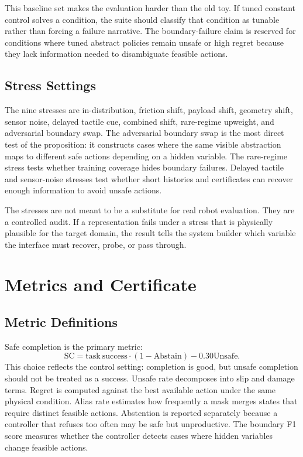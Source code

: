 \documentclass{article}
\newcommand{\safecomp}{\mathrm{SC}}
\newcommand{\unsafe}{\mathrm{Unsafe}}
\newcommand{\abstain}{\mathrm{Abstain}}
\begin{document}
This baseline set makes the evaluation harder than the old toy. If tuned
constant control solves a condition, the suite should classify that condition as
tunable rather than forcing a failure narrative. The boundary-failure claim is
reserved for conditions where tuned abstract policies remain unsafe or high regret
because they lack information needed to disambiguate feasible actions.

\subsection{Stress Settings}

The nine stresses are in-distribution, friction shift, payload shift, geometry
shift, sensor noise, delayed tactile cue, combined shift, rare-regime upweight,
and adversarial boundary swap. The adversarial boundary swap is the most direct
test of the proposition: it constructs cases where the same visible abstraction
maps to different safe actions depending on a hidden variable. The rare-regime
stress tests whether training coverage hides boundary failures. Delayed tactile
and sensor-noise stresses test whether short histories and certificates can
recover enough information to avoid unsafe actions.

The stresses are not meant to be a substitute for real robot evaluation. They are
a controlled audit. If a representation fails under a stress that is physically
plausible for the target domain, the result tells the system builder which
variable the interface must recover, probe, or pass through.

\section{Metrics and Certificate}

\subsection{Metric Definitions}

Safe completion is the primary metric:
\begin{equation}
    \safecomp = \mathrm{task\ success}\cdot(1-\abstain) - 0.30\unsafe.
\end{equation}
This choice reflects the control setting: completion is good, but unsafe
completion should not be treated as a success. Unsafe rate decomposes into slip
and damage terms. Regret is computed against the best available action under the
same physical condition. Alias rate estimates how frequently a mask merges states
that require distinct feasible actions. Abstention is reported separately because
a controller that refuses too often may be safe but unproductive. The boundary
F1 score measures whether the controller detects cases where hidden variables
change feasible actions.
\end{document}
